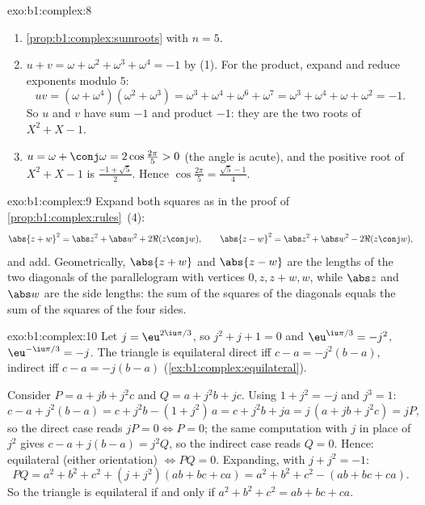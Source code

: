 \begin{solution}{exo:b1:complex:8}
\begin{enumerate}
  \item \cref{prop:b1:complex:sumroots} with $n = 5$.
  \item $u + v = \omega + \omega^2 + \omega^3 + \omega^4 = -1$ by (1).
        For the product, expand and reduce exponents modulo $5$:
        \[
        uv = (\omega + \omega^4)(\omega^2 + \omega^3)
        = \omega^3 + \omega^4 + \omega^6 + \omega^7
        = \omega^3 + \omega^4 + \omega + \omega^2 = -1 .
        \]
        So $u$ and $v$ have sum $-1$ and product $-1$: they are the
        two roots of $X^2 + X - 1$.
  \item $u = \omega + \conj\omega = 2\cos\frac{2\pi}{5} > 0$ (the
        angle is acute), and the positive root of $X^2 + X - 1$ is
        $\frac{-1 + \sqrt 5}{2}$. Hence $\cos\frac{2\pi}{5} =
        \frac{\sqrt 5 - 1}{4}$.
\end{enumerate}
\end{solution}

\begin{solution}{exo:b1:complex:9}
Expand both squares as in the proof of
\cref{prop:b1:complex:rules}~(4):
\[
\abs{z + w}^2 = \abs z^2 + \abs w^2 + 2\Re(z\conj w),
\qquad
\abs{z - w}^2 = \abs z^2 + \abs w^2 - 2\Re(z\conj w),
\]
and add. Geometrically, $\abs{z+w}$ and $\abs{z-w}$ are the lengths of
the two diagonals of the parallelogram with vertices $0, z, z+w, w$,
while $\abs z$ and $\abs w$ are the side lengths: the sum of the
squares of the diagonals equals the sum of the squares of the four
sides.
\end{solution}

\begin{solution}{exo:b1:complex:10}
Let $j = \eu^{2\iu\pi/3}$, so $j^2 + j + 1 = 0$ and $\eu^{\iu\pi/3} =
-j^2$, $\eu^{-\iu\pi/3} = -j$. The triangle is equilateral direct iff
$c - a = -j^2 (b - a)$, indirect iff $c - a = -j(b - a)$
(\cref{ex:b1:complex:equilateral}).

Consider $P = a + jb + j^2 c$ and $Q = a + j^2 b + jc$. Using $1 +
j^2 = -j$ and $j^3 = 1$:
\[
c - a + j^2(b - a) = c + j^2 b - (1 + j^2)\,a = c + j^2 b + ja
= j\,(a + jb + j^2 c) = jP,
\]
so the direct case reads $jP = 0 \iff P = 0$; the same computation
with $j$ in place of $j^2$ gives $c - a + j(b - a) = j^2 Q$, so the
indirect case reads $Q = 0$. Hence: equilateral (either orientation)
$\iff PQ = 0$. Expanding, with $j + j^2 = -1$:
\[
PQ = a^2 + b^2 + c^2 + (j + j^2)(ab + bc + ca)
= a^2 + b^2 + c^2 - (ab + bc + ca).
\]
So the triangle is equilateral if and only if $a^2 + b^2 + c^2 = ab +
bc + ca$.
\end{solution}

